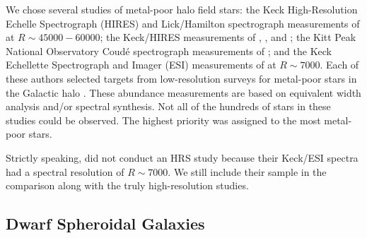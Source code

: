 \documentclass{emulateapj}
\begin{document}
We chose several studies of metal-poor halo field stars: the Keck
High-Resolution Echelle Spectrograph (HIRES) and Lick/Hamilton
spectrograph measurements of \citet{joh02} at $R \sim 45000-60000$;
the Keck/HIRES measurements of \citet{ful00}, \citet{coh02}, and
\citet{car02}; the Kitt Peak National Observatory Coud{\' e}
spectrograph measurements of \citet{pil96}; and the Keck Echellette
Spectrograph and Imager (ESI) measurements of \citet{lai04,lai07} at
$R \sim 7000$.  Each of these authors selected targets from
low-resolution surveys for metal-poor stars in the Galactic halo
\citep[][and additional references from \citeauthor{ful00}
  \citeyear{ful00}]{bon80,bee85,bee92,nor99}.  These abundance
measurements are based on equivalent width analysis and/or spectral
synthesis.  Not all of the hundreds of stars in these studies could be
observed.  The highest priority was assigned to the most metal-poor
stars.

Strictly speaking, \citet{lai04,lai07} did not conduct an HRS study
because their Keck/ESI spectra had a spectral resolution of $R \sim
7000$.  We still include their sample in the comparison along with the
truly high-resolution studies.

\subsection{Dwarf Spheroidal Galaxies}
\end{document}
